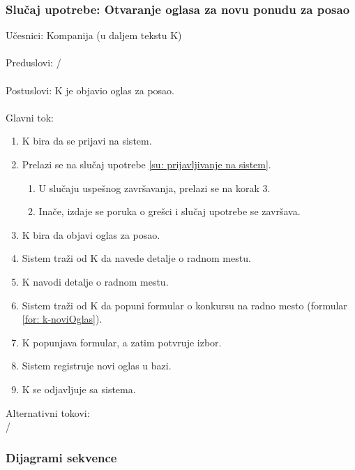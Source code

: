 \subsubsection{Slu\v caj upotrebe: Otvaranje oglasa za novu ponudu za posao}
\label{su: otvaranje oglasa za novu ponudu za posao}

\noindent U\v cesnici: Kompanija (u daljem tekstu K)
\\
\\ Preduslovi: /
\\
\\ Postuslovi: K je objavio oglas za posao.
\\ 
\\ Glavni tok:
\begin{enumerate}
	\item K bira da se prijavi na sistem.
	\item Prelazi se na slu\v caj upotrebe \ref{su: prijavljivanje na sistem}.
	\begin{enumerate}
		\item U slu\v caju uspe\v snog zavr\v savanja, prelazi se na korak 3.
		\item Ina\v ce, izdaje se poruka o gre\v sci i slu\v caj upotrebe se zavr\v sava.
	\end{enumerate}
	\item K bira da objavi oglas za posao.
	\item Sistem tra\v zi od K da navede detalje o radnom mestu.
	\item K navodi detalje o radnom mestu.
	\item Sistem tra\v zi od K da popuni formular o konkursu na radno mesto (formular \ref{for: k-noviOglas}).
	\item K popunjava formular, a zatim potvr\dj uje izbor.
	\item Sistem registruje novi oglas u bazi.
	\item K se odjavljuje sa sistema.
\end{enumerate}

\noindent Alternativni tokovi: 
\\/

\subsubsection{Dijagrami sekvence}

